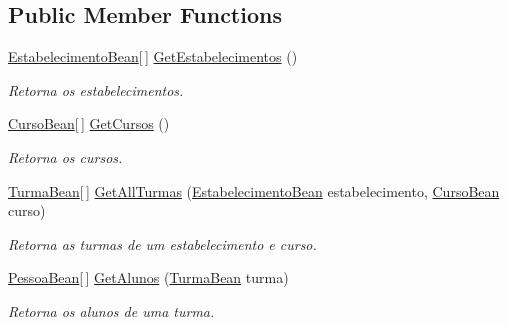 \subsection*{Public Member Functions}
\begin{DoxyCompactItemize}
\item 
\hyperlink{class_cruzeiro_1_1_core_1_1_model_1_1_beans_1_1_estabelecimento_bean}{Estabelecimento\+Bean}\mbox{[}$\,$\mbox{]} \hyperlink{class_cruzeiro_1_1_web_service_1_1_core_1_1_client_1_1_dados_cadastrais_client_ae675219e75c455866b10c07d1cc4f249}{Get\+Estabelecimentos} ()
\begin{DoxyCompactList}\small\item\em Retorna os estabelecimentos. \end{DoxyCompactList}\item 
\hyperlink{class_cruzeiro_1_1_core_1_1_model_1_1_beans_1_1_curso_bean}{Curso\+Bean}\mbox{[}$\,$\mbox{]} \hyperlink{class_cruzeiro_1_1_web_service_1_1_core_1_1_client_1_1_dados_cadastrais_client_a831c72ec18710ba74cc8668e159c2fb1}{Get\+Cursos} ()
\begin{DoxyCompactList}\small\item\em Retorna os cursos. \end{DoxyCompactList}\item 
\hyperlink{class_cruzeiro_1_1_core_1_1_model_1_1_beans_1_1_turma_bean}{Turma\+Bean}\mbox{[}$\,$\mbox{]} \hyperlink{class_cruzeiro_1_1_web_service_1_1_core_1_1_client_1_1_dados_cadastrais_client_a2a524c0a7ee80bc145eb741ea372abc0}{Get\+All\+Turmas} (\hyperlink{class_cruzeiro_1_1_core_1_1_model_1_1_beans_1_1_estabelecimento_bean}{Estabelecimento\+Bean} estabelecimento, \hyperlink{class_cruzeiro_1_1_core_1_1_model_1_1_beans_1_1_curso_bean}{Curso\+Bean} curso)
\begin{DoxyCompactList}\small\item\em Retorna as turmas de um estabelecimento e curso. \end{DoxyCompactList}\item 
\hyperlink{class_cruzeiro_1_1_core_1_1_model_1_1_beans_1_1_pessoa_bean}{Pessoa\+Bean}\mbox{[}$\,$\mbox{]} \hyperlink{class_cruzeiro_1_1_web_service_1_1_core_1_1_client_1_1_dados_cadastrais_client_a727f6229f3d7f2fecc1aa2e5d5630744}{Get\+Alunos} (\hyperlink{class_cruzeiro_1_1_core_1_1_model_1_1_beans_1_1_turma_bean}{Turma\+Bean} turma)
\begin{DoxyCompactList}\small\item\em Retorna os alunos de uma turma. \end{DoxyCompactList}\item 

\end{DoxyCompactItemize}

